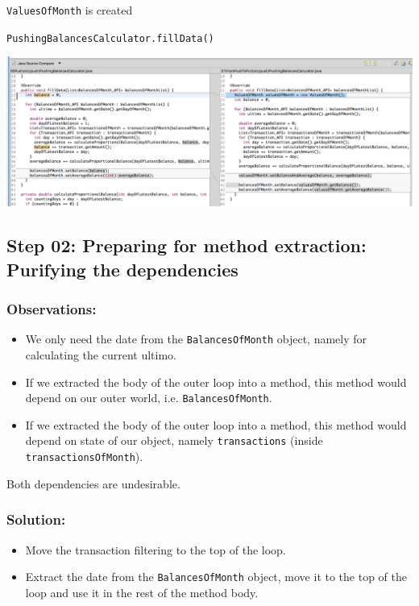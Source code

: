 \documentclass[a4paper,fleqn,titlepage,11pt]{article}
\begin{document}
\texttt{ValuesOfMonth} is created

\texttt{PushingBalancesCalculator.fillData()}

\includegraphics[width=1\textwidth]{CompareViews/Push-01.png}


\subsection*{Step 02: Preparing for method extraction: Purifying the dependencies}

\subsubsection*{Observations:}
\begin{itemize}
\item We only need the date from the \texttt{BalancesOfMonth} object, namely for calculating the current ultimo.
\item If we extracted the body of the outer loop into a method, this method would depend on our outer world, i.e. \texttt{BalancesOfMonth}.
\item If we extracted the body of the outer loop into a method, this method would depend on state of our object, namely \texttt{transactions} (inside \texttt{transactionsOfMonth}).
\end{itemize}

Both dependencies are undesirable.

\subsubsection*{Solution:}

\begin{itemize}
\item Move the transaction filtering to the top of the loop.
\item Extract the date from the \texttt{BalancesOfMonth} object, move it to the top of the loop and use it in the rest of the method body.
\end{itemize}
\end{document}
